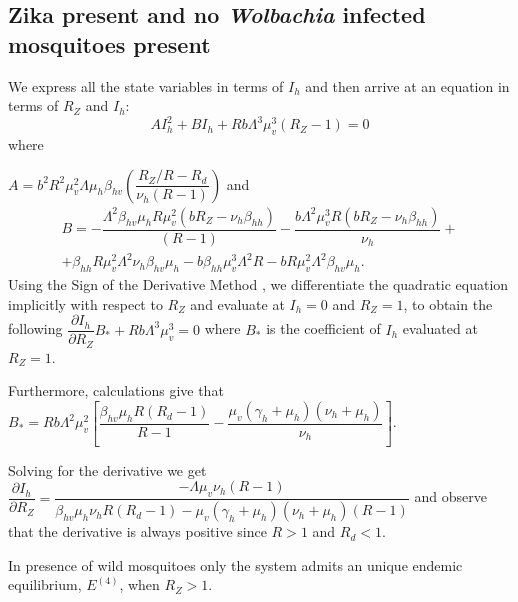 \documentclass{ws-rv9x6}
\begin{document}
\subsection{Zika present and no \textit{Wolbachia} infected mosquitoes present}
We express all the state variables in terms of $I_h$ and then arrive at an equation in terms of $R_Z$ and $I_h$:
$$AI^2_h+BI_h+Rb\Lambda^3\mu^3_v(R_Z-1)=0$$ where

\noindent $A=b^2R^2\mu^2_v\Lambda\mu_h\beta_{hv}\left(\dfrac{R_Z/R-R_d}{\nu_h(R-1)}\right)$
 and 
\begin{multline*}
B=-\dfrac{\Lambda^2\beta_{hv}\mu_hR\mu^2_v(bR_Z-\nu_h\beta_{hh})}{(R-1)}-\dfrac{b\Lambda^2 \mu^3_vR(bR_Z-\nu_h\beta_{hh})}{\nu_h}+\\
     +\beta_{hh}R\mu^2_v\Lambda^2\nu_h\beta_{hv}\mu_h-b\beta_{hh}\mu^3_v\Lambda^2R-bR\mu^2_v\Lambda^2\beta_{hv}\mu_h.
 \end{multline*}
Using the Sign of the Derivative Method \cite{martcheva2019methods}, we differentiate the quadratic equation implicitly with respect to $R_Z$ and evaluate at $I_h=0$ and $R_Z=1$, to obtain the following
$\dfrac{\partial I_h}{\partial R_Z}B_*+Rb\Lambda^3\mu^3_v=0$ where $B_*$ is the coefficient of $I_h$ evaluated at $R_Z=1.$

\noindent Furthermore, calculations give that $B_*=Rb\Lambda^2\mu_v^2\left[\dfrac{\beta_{hv}\mu_hR(R_d-1)}{R-1}-\dfrac{\mu_v(\gamma_h+\mu_h)(\nu_h+\mu_h)}{\nu_h}\right].$

\noindent Solving for the derivative we get 
    $\dfrac{\partial I_h}{\partial R_Z}
    =\dfrac{-\Lambda\mu_v\nu_h(R-1)}{\beta_{hv}\mu_h\nu_hR(R_d-1)-\mu_v(\gamma_h+\mu_h)(\nu_h+\mu_h)(R-1)}$ and observe that the derivative is always positive since $R>1$ and $R_d<1$.

\begin{theorem}
In presence of wild mosquitoes only the system admits an unique endemic equilibrium, $E^{(4)}$, when $R_Z>1.$
 
\end{theorem}
\end{document}
